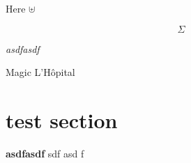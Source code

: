 \documentclass[12pt]{article}
\begin{document}
Here $\uplus$

$$\Sigma$$

\emph{asdfasdf}

Magic L'H\^{o}pital 

\section{test section}

\textbf{asdfasdf} sdf asd f
\end{document}
